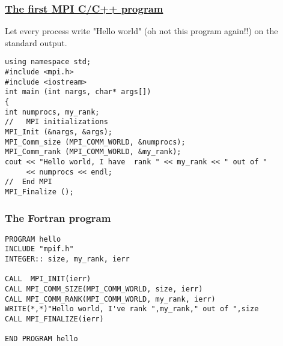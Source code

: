 \documentclass{beamer}
\begin{document}
\begin{frame}
\frametitle{\href{{https://github.com/CompPhysics/ComputationalPhysics2/blob/gh-pages/doc/Programs/LecturePrograms/programs/MPI/chapter07/program2.cpp}}{The first MPI C/C++ program}}

\begin{block}{}

Let every process write "Hello world" (oh not this program again!!) on the standard output. 















\begin{verbatim}
using namespace std;
#include <mpi.h>
#include <iostream>
int main (int nargs, char* args[])
{
int numprocs, my_rank;
//   MPI initializations
MPI_Init (&nargs, &args);
MPI_Comm_size (MPI_COMM_WORLD, &numprocs);
MPI_Comm_rank (MPI_COMM_WORLD, &my_rank);
cout << "Hello world, I have  rank " << my_rank << " out of " 
     << numprocs << endl;
//  End MPI
MPI_Finalize ();

\end{verbatim}


\end{block}
\end{frame}

\begin{frame}
\frametitle{The Fortran program}

\begin{block}{}












\begin{Verbatim}[numbers=none,fontsize=\fontsize{9pt}{9pt},baselinestretch=0.95]
PROGRAM hello
INCLUDE "mpif.h"
INTEGER:: size, my_rank, ierr

CALL  MPI_INIT(ierr)
CALL MPI_COMM_SIZE(MPI_COMM_WORLD, size, ierr)
CALL MPI_COMM_RANK(MPI_COMM_WORLD, my_rank, ierr)
WRITE(*,*)"Hello world, I've rank ",my_rank," out of ",size
CALL MPI_FINALIZE(ierr)

END PROGRAM hello

\end{Verbatim}


\end{block}
\end{frame}
\end{document}
